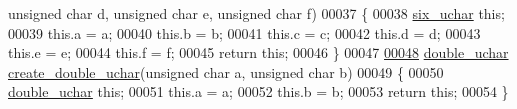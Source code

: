\begin{DoxyCode}
{      unsigned} \textcolor{keywordtype}{char} d, \textcolor{keywordtype}{unsigned} \textcolor{keywordtype}{char} e, \textcolor{keywordtype}{unsigned} \textcolor{keywordtype}{char} f)
00037 \{
00038     \hyperlink{structsix__uchar}{six\_uchar} \textcolor{keyword}{this};
00039     this.a = a;
00040     this.b = b;
00041     this.c = c;
00042     this.d = d;
00043     this.e = e;
00044     this.f = f;
00045     \textcolor{keywordflow}{return} \textcolor{keyword}{this};
00046 \}
00047 
\hypertarget{structs_8c_source.tex_l00048}{}\hyperlink{structs_8h_aecdd3a7cbfc61e4e2c33fc9215422d96}{00048} \hyperlink{structdouble__uchar}{double\_uchar} \hyperlink{structs_8c_aecdd3a7cbfc61e4e2c33fc9215422d96}{create\_double\_uchar}(\textcolor{keywordtype}{unsigned} \textcolor{keywordtype}{char} a, \textcolor{keywordtype}{unsigned} \textcolor{keywordtype}{char} b)
00049 \{
00050     \hyperlink{structdouble__uchar}{double\_uchar} \textcolor{keyword}{this};
00051     this.a = a;
00052     this.b = b;
00053     \textcolor{keywordflow}{return} \textcolor{keyword}{this};
00054 \}
\end{DoxyCode}
